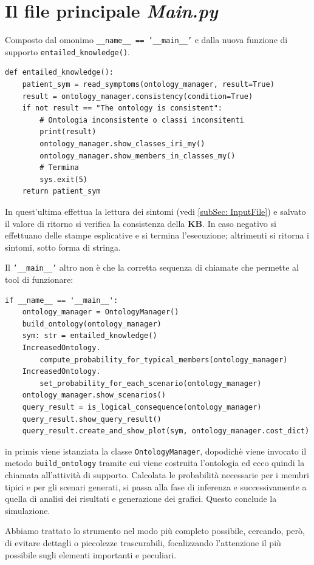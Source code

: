 \section{Il file principale \emph{Main.py}}
Composto  dal omonimo \texttt{__name__ == '__main__'} e dalla nuova funzione di 
supporto \texttt{entailed_knowledge()}.
\begin{verbatim}
def entailed_knowledge():
	patient_sym = read_symptoms(ontology_manager, result=True)
	result = ontology_manager.consistency(condition=True)
	if not result == "The ontology is consistent":
		# Ontologia inconsistente o classi inconsitenti
		print(result)
		ontology_manager.show_classes_iri_my()
		ontology_manager.show_members_in_classes_my()
		# Termina
		sys.exit(5)
	return patient_sym
\end{verbatim}
In quest'ultima effettua la lettura dei sintomi (vedi \ref{subSec: InputFile}) e salvato il
valore di ritorno si verifica la consistenza della \textbf{KB}. In caso negativo si effettuano delle stampe esplicative e si termina l'esecuzione; altrimenti si ritorna i sintomi, sotto forma di stringa.
                
Il \texttt{'__main__'} altro non è che la corretta sequenza di chiamate che 
permette al tool di funzionare: 
\begin{verbatim}
if __name__ == '__main__':
	ontology_manager = OntologyManager()
	build_ontology(ontology_manager)
	sym: str = entailed_knowledge()
	IncreasedOntology.
		compute_probability_for_typical_members(ontology_manager)
	IncreasedOntology.
		set_probability_for_each_scenario(ontology_manager)
	ontology_manager.show_scenarios()
	query_result = is_logical_consequence(ontology_manager)
	query_result.show_query_result()
	query_result.create_and_show_plot(sym, ontology_manager.cost_dict)
\end{verbatim}
in primis viene istanziata la classe \texttt{OntologyManager}, 
dopodichè viene invocato il metodo \texttt{build_ontology} tramite cui viene costruita l'ontologia ed ecco quindi la chiamata all'attività di supporto.
Calcolata le probabilità necessarie per i membri tipici e per gli scenari generati, si passa
alla fase di inferenza e successivamente a quella di analisi dei risultati e generazione dei
grafici. Questo conclude la simulazione.

Abbiamo trattato lo strumento nel modo più completo possibile, cercando, però, di evitare
dettagli o piccolezze trascurabili, focalizzando l'attenzione il più possibile sugli
elementi importanti e peculiari.
